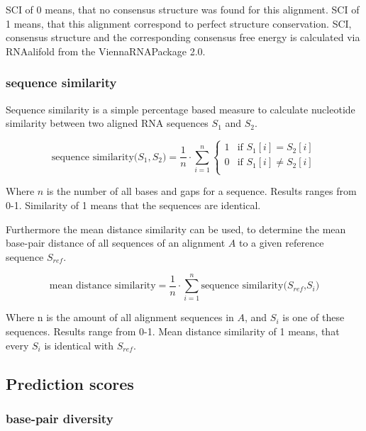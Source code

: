 \documentclass[ twoside,openright,titlepage,numbers=noenddot,headinclude,%
                footinclude=false, cleardoublepage=empty,abstractoff, %
                BCOR=5mm,paper=a4,fontsize=11pt,%
                ngerman,american,%
                ]{scrreprt}
\begin{document}
SCI of $0$ means, that no consensus structure was found for this alignment. SCI of 1 means, that this alignment correspond to perfect structure conservation. SCI, consensus structure and the corresponding consensus free energy is calculated via RNAalifold\cite{RNAalifold} from the ViennaRNAPackage 2.0\cite{ViennaRNA}.


\subsubsection{sequence similarity}
	

Sequence similarity is a simple percentage based measure to calculate nucleotide similarity
between two aligned RNA sequences $S_1$ and $S_2$.

\begin{equation}
\mbox{sequence similarity($S_1,S_2$)} = \frac{1}{n}\cdot \sum\limits^n_{i=1} \begin{cases} 
1 & \mbox{if } S_1[i]=S_2[i] \\
0 & \mbox{if } S_1[i]\not=S_2[i] \\ \end{cases}
\label{eq:sequence similarity score} 	
\end{equation}

Where $n$ is the number of all bases and gaps for a sequence.
Results ranges from 0-1. Similarity of 1 means that the sequences are identical. 

Furthermore the mean distance similarity can be used, to determine the mean base-pair distance of all sequences of an alignment $A$ to a given reference sequence $S_{ref}$. 
				 
\begin{equation}
 \mbox{mean distance similarity} =  \frac{1}{n}\cdot \sum\limits^n_{i=1} \mbox{sequence similarity($S_{ref}$,$S_i$)}
 \label{eq:sequence similarity average}	
\end{equation}

Where n is the amount of all alignment sequences in $A$, and $S_i$ is one of these sequences.
Results range from 0-1. Mean distance similarity of 1 means, that every $S_i$ is identical with $S_{ref}$.

\subsection{Prediction scores} \label{section:prediction scores}

\subsubsection{base-pair diversity} 
\end{document}
